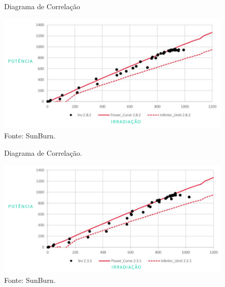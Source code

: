   
  \begin{figure}[H]
    \caption{Diagrama de Correlação} %
    \includegraphics[width=1\textwidth]{images/correlacao_1.png}
    \caption*{Fonte: SunBurn.}
    \label{fig:correlacao1_aplicacao}
  \end{figure}

  
  \begin{figure}[H]
    \caption{Diagrama de Correlação.} %
    \includegraphics[width=1\textwidth]{images/correlacao_2.png}
    \caption*{Fonte: SunBurn.}
    \label{fig:correlacao2_aplicacao}
  \end{figure}

